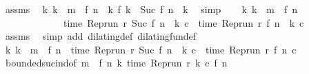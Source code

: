 \begin{isabellebody}
\ assms\ \isamarkupfalse%
\ {\isacartoucheopen}{\isasymforall}k{\isachardot}\ k\ {\isacharless}\ m\ {\isacharminus}\ {\isacharparenleft}f\ n{\isacharparenright}\ {\isasymlongrightarrow}\ {\isacharparenleft}{\isasymnexists}k\ f\ k\ {\isacharequal}\ Suc\ {\isacharparenleft}{\isacharparenleft}f\ n{\isacharparenright}\ {\isacharplus}\ k{\isacharparenright}{\isacharparenright}{\isacartoucheclose}\ \isamarkupfalse%
\ simp\isanewline
\ \ \isamarkupfalse%
\ {\isacartoucheopen}{\isasymforall}k{\isachardot}\ k\ {\isacharless}\ m\ {\isacharminus}\ {\isacharparenleft}f\ n{\isacharparenright}\isanewline
\ \ \ \ \ \ \ \ \ \ \ \ {\isasymlongrightarrow}\ time\ {\isacharparenleft}{\isacharparenleft}Rep{\isacharunderscore}run\ r{\isacharparenright}\ {\isacharparenleft}Suc\ {\isacharparenleft}{\isacharparenleft}f\ n{\isacharparenright}\ {\isacharplus}\ k{\isacharparenright}{\isacharparenright}\ c{\isacharparenright}\ {\isacharequal}\ time\ {\isacharparenleft}{\isacharparenleft}Rep{\isacharunderscore}run\ r{\isacharparenright}\ {\isacharparenleft}{\isacharparenleft}f\ n{\isacharparenright}\ {\isacharplus}\ k{\isacharparenright}\ c{\isacharparenright}{\isacartoucheclose}\isanewline
\ \ \ \ \isamarkupfalse%
\ assms{\isacharparenleft}{}{\isacharparenright}\ \isamarkupfalse%
\ {\isacharparenleft}simp\ add{\isacharcolon}\ dilating{\isacharunderscore}def\ dilating{\isacharunderscore}fun{\isacharunderscore}def{\isacharparenright}\isanewline
\ \ \isamarkupfalse%
\ {\isacharasterisk}{\isacharcolon}{\isacartoucheopen}{\isasymforall}k{\isachardot}\ k\ {\isacharless}\ m\ {\isacharminus}\ {\isacharparenleft}f\ n{\isacharparenright}\ {\isasymlongrightarrow}\ time\ {\isacharparenleft}{\isacharparenleft}Rep{\isacharunderscore}run\ r{\isacharparenright}\ {\isacharparenleft}Suc\ {\isacharparenleft}{\isacharparenleft}f\ n{\isacharparenright}\ {\isacharplus}\ k{\isacharparenright}{\isacharparenright}\ c{\isacharparenright}\ {\isacharequal}\ time\ {\isacharparenleft}{\isacharparenleft}Rep{\isacharunderscore}run\ r{\isacharparenright}\ {\isacharparenleft}f\ n{\isacharparenright}\ c{\isacharparenright}{\isacartoucheclose}\isanewline
\ \ \ \ \isamarkupfalse%
\ bounded{\isacharunderscore}suc{\isacharunderscore}ind{\isacharbrackleft}of\ {\isacartoucheopen}m\ {\isacharminus}\ {\isacharparenleft}f\ n{\isacharparenright}{\isacartoucheclose}\ {\isacartoucheopen}{\isasymlambda}k{\isachardot}\ time\ {\isacharparenleft}Rep{\isacharunderscore}run\ r\ k\ c{\isacharparenright}{\isacartoucheclose}\ {\isacartoucheopen}f\ n{\isacartoucheclose}{\isacharbrackright}\ \isamarkupfalse%

\end{isabellebody}
